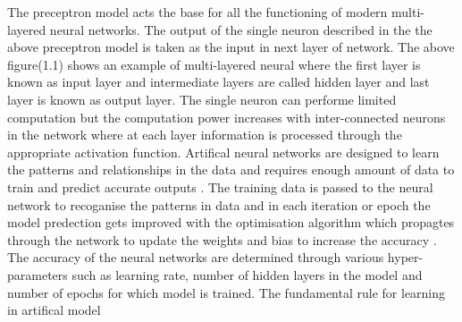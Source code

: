 The preceptron model acts the base for all the functioning of modern multi-layered neural networks.
The output of the single neuron described in the the above preceptron model is taken as the input in 
next layer of network. The above figure(1.1) shows an example of multi-layered neural where the first layer is known 
as input layer and intermediate layers are called hidden layer and last layer is known as output layer.
The single neuron can performe limited computation but the computation power increases with inter-connected
neurons in the network \citep{AGATONOVICKUSTRIN2000717} where at each layer information is processed through the appropriate 
activation function. Artifical neural networks are designed to learn the patterns and relationships in the data  and 
requires enough amount of data to train and predict accurate outputs \citep{AGATONOVICKUSTRIN2000717}.
The training data is passed to the neural network to recoganise the patterns in data and in each iteration or epoch 
the model predection gets improved with the optimisation algorithm which propagtes through the network to 
update the weights and bias to increase the accuracy \citep{AGATONOVICKUSTRIN2000717}. The accuracy of the neural networks 
are determined through various hyper-parameters such as learning rate, number of hidden layers in the model and 
number of epochs for which model is trained. The fundamental rule for learning in artifical model 


